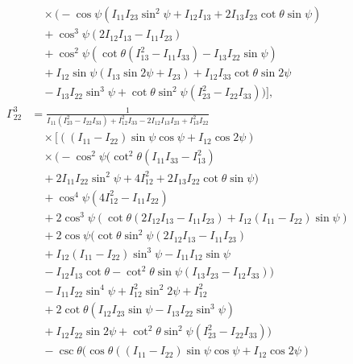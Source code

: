 \documentclass[lineno, pdflatex,sn-mathphys-ay]{sn-jnl}
\theoremstyle{thmstyleone}%
\theoremstyle{thmstyletwo}%
\theoremstyle{thmstylethree}%
\begin{document}
\begin{appendices}
\begin{align}
    &\quad \times \bigg(-\cos \psi \left(I_{11} I_{23} \sin ^2\psi+I_{12} I_{13}+2 I_{13} I_{23} \cot \theta \sin \psi\right) \nonumber \\
    &\quad +\cos ^3\psi (2 I_{12} I_{13}-I_{11} I_{23}) \nonumber \\
    &\quad +\cos ^2\psi \left(\cot \theta \left(I_{13}^2-I_{11} I_{33}\right)-I_{13} I_{22} \sin \psi\right) \nonumber \\
    &\quad +I_{12} \sin \psi (I_{13} \sin 2\psi+I_{23}) +I_{12} I_{33} \cot \theta \sin 2\psi \nonumber \\
    &\quad -I_{13} I_{22} \sin ^3\psi+\cot \theta \sin ^2\psi \left(I_{23}^2-I_{22} I_{33}\right)\bigg) \bigg], \nonumber \\
    \Gamma^{3}_{22} &= \frac{1}{I_{11} \left(I_{23}^2-I_{22} I_{33}\right)+I_{12}^2 I_{33}-2 I_{12} I_{13} I_{23}+I_{13}^2 I_{22}} \nonumber \\
    &\quad \times \bigg[ ((I_{11}-I_{22}) \sin \psi \cos \psi+I_{12} \cos 2\psi) \nonumber \\
    &\quad \times \bigg(-\cos ^2\psi \Big(\cot ^2\theta \left(I_{11} I_{33}-I_{13}^2\right) \nonumber \\
    &\quad +2 I_{11} I_{22} \sin ^2\psi+4 I_{12}^2+2 I_{13} I_{22} \cot \theta \sin \psi\Big) \nonumber \\
    &\quad +\cos ^4\psi \left(4 I_{12}^2-I_{11} I_{22}\right) \nonumber \\
    &\quad +2 \cos ^3\psi (\cot \theta (2 I_{12} I_{13}-I_{11} I_{23})+I_{12} (I_{11}-I_{22}) \sin \psi) \nonumber \\
    &\quad +2 \cos \psi \Big(\cot \theta \sin ^2\psi (2 I_{12} I_{13}-I_{11} I_{23}) \nonumber \\
    &\quad +I_{12} (I_{11}-I_{22}) \sin ^3\psi -I_{11} I_{12} \sin \psi \nonumber \\
    &\quad -I_{12} I_{13} \cot \theta-\cot ^2\theta \sin \psi (I_{13} I_{23}-I_{12} I_{33})\Big) \nonumber \\
    &\quad -I_{11} I_{22} \sin ^4\psi+I_{12}^2 \sin ^2 2\psi+I_{12}^2 \nonumber \\
    &\quad +2 \cot \theta \left(I_{12} I_{23} \sin \psi-I_{13} I_{22} \sin ^3\psi\right) \nonumber \\
    &\quad +I_{12} I_{22} \sin 2\psi+\cot ^2\theta \sin ^2\psi \left(I_{23}^2-I_{22} I_{33}\right)\bigg) \nonumber \\
    &\quad -\csc \theta (\cos \theta ((I_{11}-I_{22}) \sin \psi \cos \psi+I_{12} \cos 2\psi) \nonumber \\

\end{align}
\end{appendices}
\end{document}

